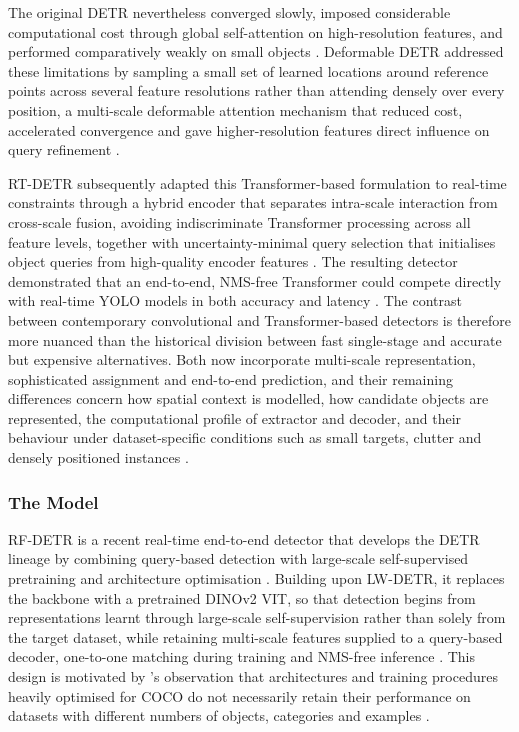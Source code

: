 The original \gls{DETR} nevertheless converged slowly, imposed considerable computational cost through global self-attention on high-resolution features, and performed comparatively weakly on small objects \cite{carion2020end,yu2025detrreview}. Deformable \gls{DETR} addressed these limitations by sampling a small set of learned locations around reference points across several feature resolutions rather than attending densely over every position, a multi-scale deformable attention mechanism that reduced cost, accelerated convergence and gave higher-resolution features direct influence on query refinement \cite{zhu2021deformabledetr}.

\gls{RT-DETR} subsequently adapted this Transform\-er-based formulation to real-time constraints through a hybrid encoder that separates intra-scale interaction from cross-scale fusion, avoiding indiscriminate Transformer processing across all feature levels, together with uncertainty-minimal query selection that initialises object queries from high-quality encoder features \cite{zhao2024rtdetr}. The resulting detector demonstrated that an end-to-end, \gls{NMS}-free Transformer could compete directly with real-time \gls{YOLO} models in both accuracy and latency \cite{zhao2024rtdetr}. The contrast between contemporary convolutional and Transformer-based detectors is therefore more nuanced than the historical division between fast single-stage and accurate but expensive alternatives. Both now incorporate multi-scale representation, sophisticated assignment and end-to-end prediction, and their remaining differences concern how spatial context is modelled, how candidate objects are represented, the computational profile of extractor and decoder, and their behaviour under dataset-specific conditions such as small targets, clutter and densely positioned instances \cite{yu2025detrreview}.

\subsubsection{The  Model}
\label{sec:bg-rfdetr}
\gls{RF-DETR} is a recent real-time end-to-end detector that develops the \gls{DETR} lineage by combining query-based detection with large-scale self-supervised pretraining and architecture optimisation \cite{robinson2026rfdetrneuralarchitecturesearch}. Building upon \gls{LW-DETR}, it replaces the backbone with a pretrained \gls{DINO}v2 \gls{VIT}, so that detection begins from representations learnt through large-scale self-supervision rather than solely from the target dataset, while retaining multi-scale features supplied to a query-based decoder, one-to-one matching during training and \gls{NMS}-free inference \cite{robinson2026rfdetrneuralarchitecturesearch}. This design is motivated by \citeauthor{robinson2026rfdetrneuralarchitecturesearch}'s observation that architectures and training procedures heavily optimised for \gls{COCO} do not necessarily retain their performance on datasets with different numbers of objects, categories and examples \cite{robinson2026rfdetrneuralarchitecturesearch}.

